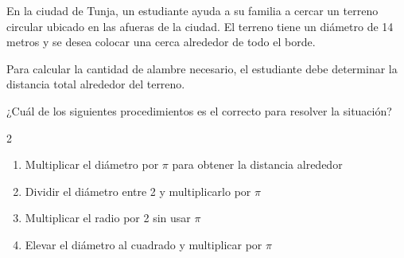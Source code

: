En la ciudad de Tunja, un estudiante ayuda a su familia a cercar un terreno circular ubicado en las afueras de la ciudad. El terreno tiene un diámetro de 14 metros y se desea colocar una cerca alrededor de todo el borde.

Para calcular la cantidad de alambre necesario, el estudiante debe determinar la distancia total alrededor del terreno.

¿Cuál de los siguientes procedimientos es el correcto para resolver la situación?

\begin{multicols}{2}
\begin{enumerate}[label=\alph*), leftmargin=*]
\item Multiplicar el diámetro por $\pi$ para obtener la distancia alrededor
\item Dividir el diámetro entre 2 y multiplicarlo por $\pi$
\item Multiplicar el radio por 2 sin usar $\pi$
\item Elevar el diámetro al cuadrado y multiplicar por $\pi$
\end{enumerate}
\end{multicols}